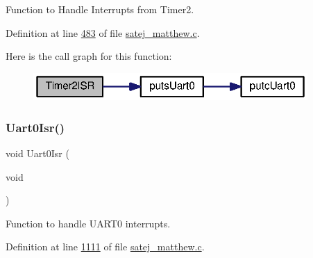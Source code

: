 Function to Handle Interrupts from Timer2. 



Definition at line \mbox{\hyperlink{satej__matthew_8c_source_l00483}{483}} of file \mbox{\hyperlink{satej__matthew_8c_source}{satej\+\_\+matthew.\+c}}.

Here is the call graph for this function\+:
\nopagebreak
\begin{figure}[H]
\begin{center}
\leavevmode
\includegraphics[width=296pt]{tm4c123gh6pm__startup__ccs_8c_a424b9010ddc61d3484dca1b6af5af5b0_cgraph}
\end{center}
\end{figure}
\mbox{\label{tm4c123gh6pm__startup__ccs_8c_affa7c2cc09d04fc57b05c5644b1c8a68}} 
\subsubsection{\texorpdfstring{Uart0Isr()}{Uart0Isr()}}
{\footnotesize\ttfamily void Uart0\+Isr (\begin{DoxyParamCaption}\item[{void}]{ }\end{DoxyParamCaption})}



Function to handle U\+A\+R\+T0 interrupts. 



Definition at line \mbox{\hyperlink{satej__matthew_8c_source_l01111}{1111}} of file \mbox{\hyperlink{satej__matthew_8c_source}{satej\+\_\+matthew.\+c}}.

